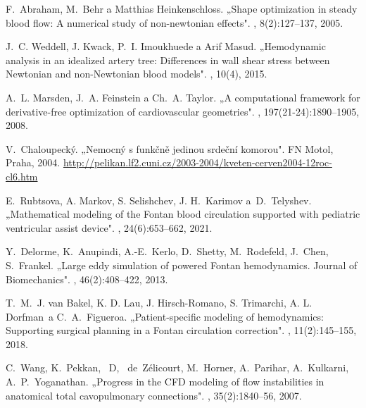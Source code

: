 \begin{thebibliography}{10}
	
	F.~Abraham, M.~Behr a Matthias Heinkenschloss.
	\newblock „{S}hape optimization in steady blood flow: A numerical study of
	non-newtonian effects".
	,
	8(2):127--137, 2005.
	
	J.~C. Weddell, J. Kwack, P.~I. Imoukhuede a Arif Masud.
	\newblock „{H}emodynamic analysis in an idealized artery tree: Differences in wall
	shear stress between Newtonian and non-Newtonian blood models".
	, 10(4), 2015.
	
	A.~L. Marsden, J.~A. Feinstein a Ch.~A. Taylor.
	\newblock „{A} computational framework for derivative-free optimization of
	cardiovascular geometries".
	,
	197(21-24):1890--1905, 2008.
	
	V.~Chaloupecký.
	\newblock „{N}emocný s funkčně jedinou srdeční komorou".
	FN Motol, Praha,
	2004. \url{http://pelikan.lf2.cuni.cz/2003-2004/kveten-cerven2004-12roc-cl6.htm}
	
	E.~Rubtsova{,} A. Markov{,} S. Selishchev{,} J. H.~Karimov a~D.~Telyshev.
	\newblock „{M}athematical modeling of the Fontan blood circulation supported
	with pediatric ventricular assist device".
	,
	24(6):653--662, 2021.
	
	Y.~Delorme{,} K.~Anupindi{,} A.-E.~Kerlo{,} D.~Shetty{,} M.~Rodefeld{,} J.~Chen{,} S.~Frankel.
	\newblock „{L}arge eddy simulation of powered Fontan hemodynamics. Journal of Biomechanics".
	,
	46(2):408--422, 2013.
	
	T.~M.~J. van Bakel{,} K. D. Lau{,} J. Hirsch-Romano{,} S. Trimarchi{,} A. L.
	Dorfman~a C.~A.~Figueroa.
	\newblock „{P}atient-specific modeling of hemodynamics: Supporting surgical
	planning in a Fontan circulation correction".
	,
	11(2):145--155, 2018.
	
	C.~Wang{,} K.~Pekkan{,} ~D{,} ~de~Zélicourt{,} M.~Horner{,} A.~Parihar{,} A.~Kulkarni{,} A.~P.~Yoganathan.
	\newblock „{P}rogress in the CFD modeling of flow instabilities in anatomical total cavopulmonary connections".
	,
	35(2):1840--56, 2007.
	

\end{thebibliography}

